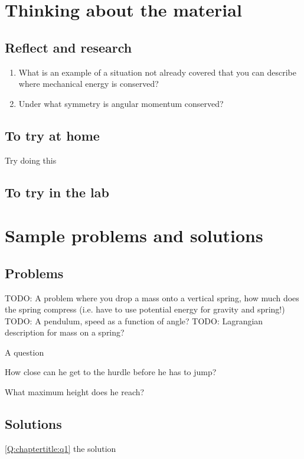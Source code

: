 \newpage
\section{Thinking about the material}
\subsection{Reflect and research}

\begin{enumerate}
\item What is an example of a situation not already covered that you can describe where mechanical energy is conserved?
\item Under what symmetry is angular momentum conserved?
\end{enumerate}
\subsection{To try at home}

\begin{tQuestion}Try doing this \end{tQuestion}

\subsection{To try in the lab}

\newpage
\section{Sample problems and solutions}
\subsection{Problems}
TODO: A problem where you drop a mass onto a vertical spring, how much does the spring compress (i.e. have to use potential energy for gravity and spring!)
TODO: A pendulum, speed as a function of angle?
TODO: Lagrangian description for mass on a spring? 

\begin{problemParts}{A question\label{Q:chaptertitle:q1}}
\item How close can he get to the hurdle before he has to jump?
\item What maximum height does he reach?
\end{problemParts}

\newpage
\subsection{Solutions}
\begin{solution}{\ref{Q:chaptertitle:q1}}
{
the solution
}
\end{solution}

